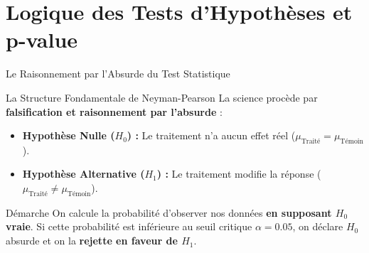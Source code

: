 \documentclass[aspectratio=169,10pt]{beamer}
\begin{document}
\section{Logique des Tests d'Hypothèses et p-value}

\begin{frame}{Le Raisonnement par l'Absurde du Test Statistique}
  \begin{conceptbox}{La Structure Fondamentale de Neyman-Pearson}
    La science procède par \textbf{falsification et raisonnement par l'absurde} :
    \begin{itemize}\setlength{\itemsep}{1.5pt}
      \item \textbf{Hypothèse Nulle ($H_0$) :} Le traitement n'a aucun effet réel ($\mu_{\text{Traité}} = \mu_{\text{Témoin}}$).
      \item \textbf{Hypothèse Alternative ($H_1$) :} Le traitement modifie la réponse ($\mu_{\text{Traité}} \neq \mu_{\text{Témoin}}$).
    \end{itemize}
  \end{conceptbox}
  \vspace{1.5mm}
  \begin{takeawaybox}{Démarche}
    On calcule la probabilité d'observer nos données \textbf{en supposant $H_0$ vraie}. Si cette probabilité est inférieure au seuil critique $\alpha = 0.05$, on déclare $H_0$ absurde et on la \textbf{rejette en faveur de $H_1$}.
  \end{takeawaybox}
\end{frame}
\end{document}
